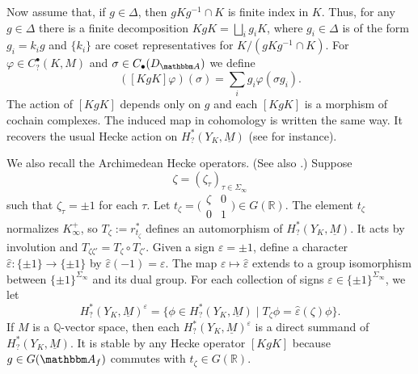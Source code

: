 \documentclass[10pt, twoside]{amsart}
\theoremstyle{plain}
\theoremstyle{definition}
\theoremstyle{remark}
\numberwithin{equation}{subsection}
\def\Q{\mathbb Q}
\def\R{\mathbb R}
\def\A{\mathbbm A}
\newcommand{\smallmat}[4]{\bigl(\begin{smallmatrix}#1&#2\\#3&#4\end{smallmatrix}\bigr)}
\begin{document}
Now assume that, if $g \in \Delta$, then $gKg^{-1} \cap K$ is finite index in $K$. Thus, for any $g \in \Delta$ there is a finite decomposition $KgK = \bigsqcup_i g_i K$, where $g_i \in \Delta$ is of the form $g_i = k_i g$ and $\{k_i\}$ are coset representatives for $K/(gKg^{-1} \cap K)$. For $\varphi \in C^{\bullet}_{?}(K,M)$ and $\sigma \in C_{\bullet}(D_{\A})$ we define
\begin{equation}\label{eqn:hecke-adelic-cochain}
([Kg K]\varphi)(\sigma) = \sum_i g_i \varphi(\sigma g_i).
\end{equation}
The action of $[KgK]$ depends only on $g$ and each $[KgK]$ is a morphism of cochain complexes. The induced map in cohomology is written the same way. It recovers the usual Hecke action on $H^{\ast}_{?}(Y_K,\underline M)$ (see \cite[\S 2.2]{BH} for instance).

We also recall the Archimedean Hecke operators. (See also \cite[\S 4.1]{BH}.) Suppose \[\zeta = (\zeta_\tau)_{\tau \in \Sigma_\infty}\] such that $\zeta_\tau = \pm 1$ for each $\tau$. Let $t_\zeta = \smallmat \zeta 0 0 1 \in G(\R)$. The element $t_\zeta$ normalizes $K_\infty^+$, so $T_\zeta := r_{t_\zeta}^{\ast}$ defines an automorphism of $H^{\ast}_{?}(Y_K,\underline M)$. It acts by involution and $T_{\zeta\zeta'} = T_{\zeta}\circ T_{\zeta'}$.  Given a sign $\varepsilon = \pm 1$, define a character $\widehat{\varepsilon} : \{\pm 1\} \rightarrow \{\pm 1\}$ by $\widehat{\varepsilon}(-1) = \varepsilon$. The map $\varepsilon \mapsto \widehat{\varepsilon}$ extends to a group isomorphism between $\{\pm 1\}^{\Sigma_\infty}$ and its dual group. For each collection of signs $\varepsilon \in \{\pm 1\}^{\Sigma_\infty}$, we let
$$
H^{\ast}_{?}(Y_K,\underline M)^{\varepsilon} = \{\phi \in H^{\ast}_{?}(Y_K,\underline M) \mid T_{\zeta}\phi = \widehat{\varepsilon}(\zeta)\phi\}.
$$
If $M$ is a $\Q$-vector space, then each $H^{\ast}_{?}(Y_K,\underline M)^{\varepsilon}$ is a direct summand of $H^{\ast}_{?}(Y_K,\underline M)$. It is stable by any Hecke operator $[KgK]$ because $g \in G(\A_f)$ commutes with $t_\zeta \in G(\R)$.
\end{document}
